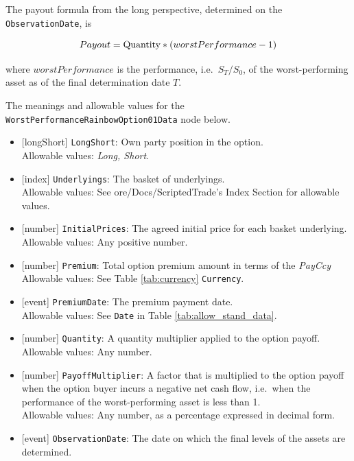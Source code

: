The payout formula from the long perspective, determined on the \lstinline!ObservationDate!, is

\begin{equation*}
  Payout = \text{\lstinline!Quantity!} * (worstPerformance - 1)
\end{equation*}

where $worstPerformance$ is the performance, i.e.\ $S_T/S_0$, of the worst-performing asset as of the
final determination date $T$.

The meanings and allowable values for the \lstinline!WorstPerformanceRainbowOption01Data! node below.

\begin{itemize}
  \item{}[longShort] \lstinline!LongShort!: Own party position in the option. \\
  Allowable values: \emph{Long, Short}.
  \item{}[index] \lstinline!Underlyings!: The basket of underlyings. \\
  Allowable values: See ore/Docs/ScriptedTrade's Index Section for allowable values.
  \item{}[number] \lstinline!InitialPrices!: The agreed initial price for each basket underlying. \\
  Allowable values: Any positive number.
  \item{}[number] \lstinline!Premium!: Total option premium amount in terms of the \emph{PayCcy} \\
  Allowable values: See Table \ref{tab:currency} \lstinline!Currency!.
  \item{}[event] \lstinline!PremiumDate!: The premium payment date. \\
  Allowable values: See \lstinline!Date! in Table \ref{tab:allow_stand_data}.
  \item{}[number] \lstinline!Quantity!: A quantity multiplier applied to the option payoff. \\
  Allowable values: Any number.
  \item{}[number] \lstinline!PayoffMultiplier!: A factor that is multiplied to the option payoff when the option buyer incurs a negative net cash flow, i.e.\ when the performance of the worst-performing asset is less than 1. \\
  Allowable values: Any number, as a percentage expressed in decimal form.
  \item{}[event] \lstinline!ObservationDate!: The date on which the final levels of the assets are determined. \\

\end{itemize}
